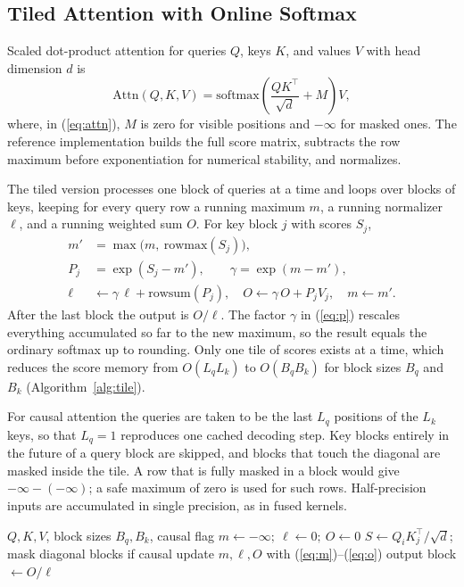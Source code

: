 \documentclass[conference]{IEEEtran}
\begin{document}
\subsection{Tiled Attention with Online Softmax}
Scaled dot-product attention for queries $Q$, keys $K$, and values $V$ with head dimension $d$ is
\begin{equation}
\mathrm{Attn}(Q,K,V)=\mathrm{softmax}\!\left(\frac{QK^{\top}}{\sqrt{d}}+M\right)V,
\label{eq:attn}
\end{equation}
where, in (\ref{eq:attn}), $M$ is zero for visible positions and $-\infty$ for masked ones. The reference implementation builds the full score matrix, subtracts the row maximum before exponentiation for numerical stability, and normalizes.

The tiled version processes one block of queries at a time and loops over blocks of keys, keeping for every query row a running maximum $m$, a running normalizer $\ell$, and a running weighted sum $O$. For key block $j$ with scores $S_j$,
\begin{align}
m' &= \max\!\big(m,\ \mathrm{rowmax}(S_j)\big), \label{eq:m}\\
P_j &= \exp(S_j - m'), \qquad \gamma = \exp(m - m'), \label{eq:p}\\
\ell &\leftarrow \gamma\,\ell + \mathrm{rowsum}(P_j), \quad O \leftarrow \gamma\,O + P_jV_j, \quad m\leftarrow m'. \label{eq:o}
\end{align}
After the last block the output is $O/\ell$. The factor $\gamma$ in (\ref{eq:p}) rescales everything accumulated so far to the new maximum, so the result equals the ordinary softmax up to rounding. Only one tile of scores exists at a time, which reduces the score memory from $O(L_qL_k)$ to $O(B_qB_k)$ for block sizes $B_q$ and $B_k$ (Algorithm~\ref{alg:tile}).

For causal attention the queries are taken to be the last $L_q$ positions of the $L_k$ keys, so that $L_q=1$ reproduces one cached decoding step. Key blocks entirely in the future of a query block are skipped, and blocks that touch the diagonal are masked inside the tile. A row that is fully masked in a block would give $-\infty-(-\infty)$; a safe maximum of zero is used for such rows. Half-precision inputs are accumulated in single precision, as in fused kernels.

\begin{algorithm}[!t]
\caption{Tiled attention with online softmax}
\label{alg:tile}
\small
\begin{algorithmic}[1]
\Require $Q, K, V$, block sizes $B_q, B_k$, causal flag
  \State $m\gets-\infty;\ \ell\gets 0;\ O\gets 0$
    \State $S\gets Q_iK_j^{\top}/\sqrt{d}$; mask diagonal blocks if causal
    \State update $m,\ell,O$ with (\ref{eq:m})--(\ref{eq:o})
  \EndFor
  \State output block $\gets O/\ell$
\EndFor
\end{algorithmic}
\end{algorithm}
\end{document}
